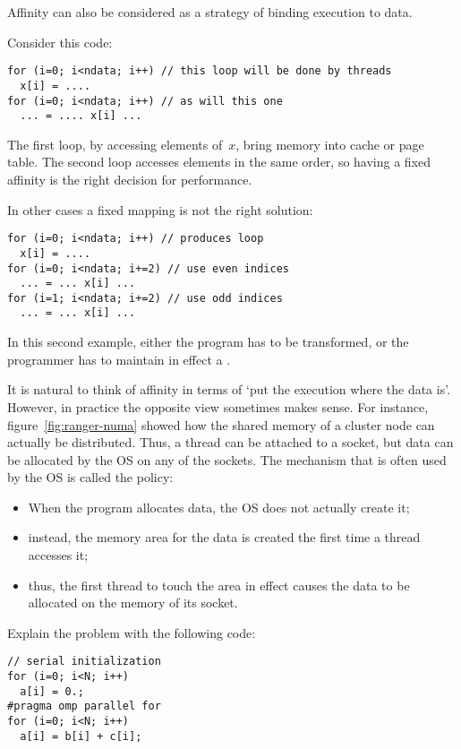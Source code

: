 
Affinity can also be considered as a strategy of binding execution to data.

Consider this code:
\begin{verbatim}
for (i=0; i<ndata; i++) // this loop will be done by threads
  x[i] = ....
for (i=0; i<ndata; i++) // as will this one
  ... = .... x[i] ...
\end{verbatim}
The first loop, by accessing elements of~$x$, bring memory into cache
or page table. The second loop accesses elements in the same order, so
having a fixed affinity is the right decision for performance.

In other cases a fixed mapping is not the right solution:
\begin{verbatim}
for (i=0; i<ndata; i++) // produces loop
  x[i] = ....
for (i=0; i<ndata; i+=2) // use even indices
  ... = ... x[i] ...
for (i=1; i<ndata; i+=2) // use odd indices
  ... = ... x[i] ...
\end{verbatim}
In this second example, either the program has to be transformed, or
the programmer has to maintain in effect a .



It is natural to think of affinity in terms of `put the
execution where the data is'. However, in practice the opposite view
sometimes makes sense.  For instance, figure~\ref{fig:ranger-numa}
showed how the shared memory of a cluster node can actually be
distributed. Thus, a thread can be attached to a socket, but data can
be allocated by the \ac{OS} on any of the sockets.  The mechanism that
is often used by the \ac{OS} is called the 
policy:
\begin{itemize}
\item When the program allocates data, the \ac{OS} does not actually
  create it;
\item instead, the memory area for the data is created the first
  time a thread accesses it;
\item thus, the first thread to touch the area in effect causes the
  data to be allocated on the memory of its socket.
\end{itemize}

\begin{exercise}
  Explain the problem with the following code:
\begin{verbatim}
// serial initialization
for (i=0; i<N; i++)
  a[i] = 0.;
#pragma omp parallel for
for (i=0; i<N; i++)
  a[i] = b[i] + c[i];
\end{verbatim}
\end{exercise}

